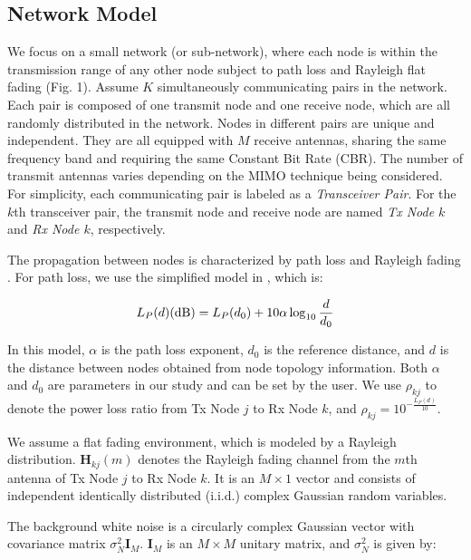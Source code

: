 \documentclass[draftcls,onecolumn,peerview,12pt]{IEEEtran}
\begin{document}
\subsection{Network Model}
We focus on a small network (or sub-network), where each node is
within the transmission range of any other node subject to path loss
and Rayleigh flat fading (Fig. 1). Assume $K$ simultaneously
communicating pairs in the network. Each pair is composed of one
transmit node and one receive node, which are all randomly
distributed in the network. Nodes in different pairs are unique and
independent. They are all equipped with $M$ receive antennas,
sharing the same frequency band and requiring the same Constant Bit
Rate (CBR). The number of transmit antennas varies depending on the
MIMO technique being considered. For simplicity, each communicating
pair is labeled as a \textit{Transceiver Pair}. For the $k$th
transceiver pair, the transmit node and receive node are named
\textit{Tx Node $k$ } and \textit{Rx Node $k$}, respectively.



The propagation between nodes is characterized by path loss and
Rayleigh fading \cite{10_rate_regions, 11_spatial_reuse,
12_Wireless_Rappaport}. For path loss, we use the simplified model
in \cite{12_Wireless_Rappaport}, which is:

\begin{equation}
L_{P}(d) (\textrm{dB}) = L_{P}(d_{0})+10\alpha\log_{10} { d \over
d_{0} }
\end{equation}

In this model, $\alpha$ is the path loss exponent, $d_{0}$ is the
reference distance, and $d$ is the distance between nodes obtained
from node topology information. Both $\alpha $ and $d_{0}$ are
parameters in our study and can be set by the user. We use
$\rho_{kj}$ to denote the power loss ratio from Tx Node $j$ to Rx
Node $k$, and $\rho_{kj}=10^{-\frac{L_{P}(d)}{10}}$.

We assume a flat fading environment, which is modeled by a Rayleigh
distribution. $\textbf{H}_{kj}(m)$ denotes the Rayleigh fading
channel from the $m$th antenna of Tx Node $j$ to Rx Node $k$. It is
an $M\times 1$ vector and consists of independent identically
distributed (i.i.d.) complex Gaussian random variables.

The background white noise is a circularly complex Gaussian vector
with covariance matrix $\sigma_{N}^{2}\textbf{I}_{M}$.
$\textbf{I}_{M}$ is an $M \times M$ unitary matrix, and $\sigma_N^2$
is given by:
\end{document}
